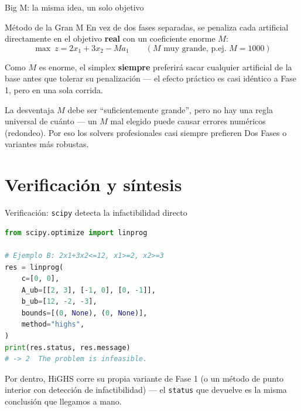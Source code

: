 \documentclass[aspectratio=169]{beamer}
\begin{document}
\begin{frame}{Big M: la misma idea, un solo objetivo}
\begin{block}{Método de la Gran M}
\small En vez de dos fases separadas, se penaliza cada artificial directamente en el objetivo \textbf{real} con un coeficiente enorme $M$:
\[
\max\ z = 2x_1+3x_2 - M a_1 \qquad (M \text{ muy grande, p.ej. } M=1000)
\]
\normalsize
\end{block}

\vspace{-0.1cm}
\small Como $M$ es enorme, el simplex \textbf{siempre} preferirá sacar cualquier artificial de la base antes que tolerar su penalización --- el efecto práctico es casi idéntico a Fase 1, pero en una sola corrida.

\begin{alertblock}{La desventaja}
\small $M$ debe ser ``suficientemente grande'', pero no hay una regla universal de cuánto --- un $M$ mal elegido puede causar errores numéricos (redondeo). Por eso los solvers profesionales casi siempre prefieren Dos Fases o variantes más robustas.
\normalsize
\end{alertblock}
\end{frame}

\section{Verificación y síntesis}

\begin{frame}[fragile]{Verificación: \texttt{scipy} detecta la infactibilidad directo}
\begin{lstlisting}[language=Python]
from scipy.optimize import linprog

# Ejemplo B: 2x1+3x2<=12, x1>=2, x2>=3
res = linprog(
    c=[0, 0],
    A_ub=[[2, 3], [-1, 0], [0, -1]],
    b_ub=[12, -2, -3],
    bounds=[(0, None), (0, None)],
    method="highs",
)
print(res.status, res.message)
# -> 2  The problem is infeasible.
\end{lstlisting}

Por dentro, HiGHS corre su propia variante de Fase 1 (o un método de punto interior con detección de infactibilidad) --- el \texttt{status} que devuelve es la misma conclusión que llegamos a mano.
\end{frame}
\end{document}

